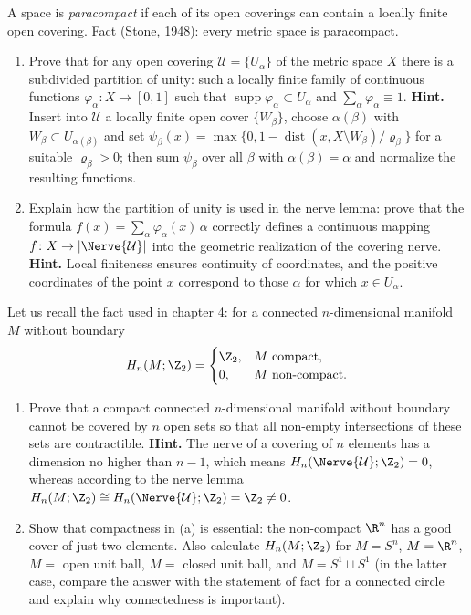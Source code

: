 \documentclass[a4paper,12pt]{report}
\begin{document}
\begin{task}
A space is \emph{paracompact} if each of its open coverings can contain a locally finite open covering. Fact \textup{(}Stone, \textup{1948}\textup{)}\textup{:} every metric space is paracompact.
\begin{enumerate}[label=\textup{(\alph*)}]
\item Prove that for any open covering $\mathcal U = \{U_\alpha\}$ of the metric space $X$ there is a subdivided partition of unity\textup{:} such a locally finite family of continuous functions $\varphi_\alpha \colon X \to [0, 1]$ such that $\operatorname{supp} \varphi_\alpha \subset U_\alpha$ and $\sum_\alpha \varphi_\alpha \equiv 1$. \textbf{Hint.} Insert into $\mathcal U$ a locally finite open cover $\{W_\beta\}$, choose $\alpha(\beta)$ with $W_\beta \subset U_{\alpha(\beta)}$ and set $\psi_\beta(x) = \max\bigl\{0, 1 - \operatorname{dist}(x, X \setminus W_\beta)/\varrho_\beta\bigr\}$ for a suitable $\varrho_\beta > 0$\textup{;} then sum $\psi_\beta$ over all $\beta$ with $\alpha(\beta) = \alpha$ and normalize the resulting functions.
\item Explain how the partition of unity is used in the nerve lemma\textup{:} prove that the formula $f(x) = \sum_\alpha \varphi_\alpha(x) \, \alpha$ correctly defines a continuous mapping $f \colon X \to |\Nerve{\mathcal U}|$ into the geometric realization of the covering nerve. \textbf{Hint.} Local finiteness ensures continuity of coordinates, and the positive coordinates of the point $x$ correspond to those $\alpha$ for which $x \in U_\alpha$.
\end{enumerate}
\end{task}

\begin{task}
Let us recall the fact used in chapter \textup{4}\textup{:} for a connected $n$-dimensional manifold $M$ without boundary
\[
H_n(M; \Z_2) = \begin{cases} \Z_2, & M \text{ compact}, \\ 0, & M \text{ non-compact}. \end{cases}
\]
\begin{enumerate}[label=\textup{(\alph*)}]
\item Prove that a compact connected $n$-dimensional manifold without boundary cannot be covered by $n$ open sets so that all non-empty intersections of these sets are contractible. \textbf{Hint.} The nerve of a covering of $n$ elements has a dimension no higher than $n-1$, which means $H_n(\Nerve{\mathcal U}; \Z_2) = 0$, whereas according to the nerve lemma $H_n(M; \Z_2) \cong H_n(\Nerve{\mathcal U}; \Z_2) = \Z_2 \neq 0$.
\item Show that compactness in \textup{(a)} is essential\textup{:} the non-compact $\R^n$ has a good cover of just two elements. Also calculate $H_n(M; \Z_2)$ for $M = S^n$, $M = \R^n$, $M = $ open unit ball, $M = $ closed unit ball, and $M = S^1 \sqcup S^1$ \textup{(}in the latter case, compare the answer with the statement of fact for a connected circle and explain why connectedness is important\textup{)}.
\end{enumerate}
\end{task}
\end{document}
